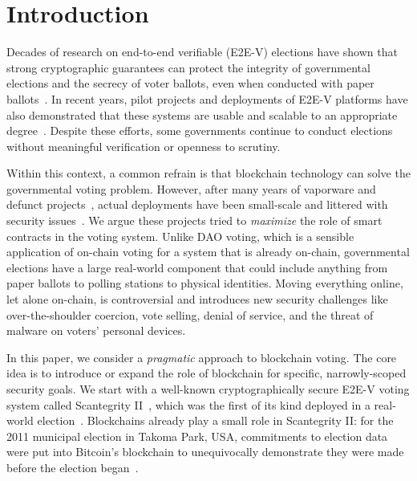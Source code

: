 \section{Introduction}

Decades of research on end-to-end verifiable (E2E-V) elections have shown that strong cryptographic guarantees can protect the integrity of governmental elections and the secrecy of voter ballots, even when conducted with paper ballots~\cite{HR16}. 
In recent years, pilot projects and deployments of E2E-V platforms have also demonstrated that these systems are usable and scalable to an appropriate degree~\cite{AMPQ09,CCC+10,BBB+13,CRST15}. 
Despite these efforts, some governments continue to conduct elections without meaningful verification or openness to scrutiny.


Within this context, a common refrain is that blockchain technology can solve the governmental voting problem. However, after many years of vaporware and defunct projects~\cite{KSM21,Ern25}, actual deployments have been small-scale and littered with security issues~\cite{SKW20,GG20}. We argue these projects tried to \textit{maximize} the role of smart contracts in the voting system. Unlike DAO voting, which is a sensible application of on-chain voting for a system that is already on-chain, governmental elections have a large real-world component that could include anything from paper ballots to polling stations to physical identities. Moving everything online, let alone on-chain, is controversial and introduces new security challenges like over-the-shoulder coercion, vote selling, denial of service, and the threat of malware on voters' personal devices. 

In this paper, we consider a \textit{pragmatic} approach to blockchain voting. The core idea is to introduce or expand the role of blockchain for specific, narrowly-scoped security goals. We start with a well-known cryptographically secure E2E-V voting system called Scantegrity II~\cite{CCC+08}, which was the first of its kind deployed in a real-world election~\cite{CCC+10}. Blockchains already play a small role in Scantegrity II: for the 2011 municipal election in Takoma Park, USA, commitments to election data were put into Bitcoin's blockchain to unequivocally demonstrate they were made before the election began~\cite{CE12}.

